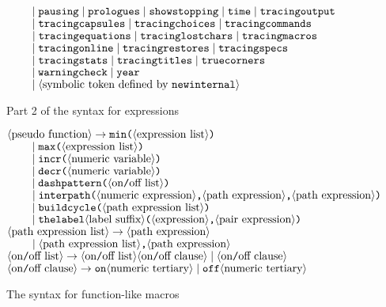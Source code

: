 \begin{figure}[htp]
\begin{ctabbing}
$\tt \qquad \;|\; pausing \;|\; prologues \;|\; showstopping \;|\; time \;|\; tracingoutput$\\
$\tt \qquad \;|\; tracingcapsules \;|\; tracingchoices \;|\; tracingcommands$\\
$\tt \qquad \;|\; tracingequations \;|\; tracinglostchars \;|\; tracingmacros$\\
$\tt \qquad \;|\; tracingonline \;|\; tracingrestores \;|\; tracingspecs$\\
$\tt \qquad \;|\; tracingstats \;|\; tracingtitles \;|\; truecorners$\\
$\tt \qquad \;|\; warningcheck \;|\; year$\\
$\tt \qquad \;|\; {\langle\hbox{symbolic token defined by {\tt newinternal}}\rangle}$
\end{ctabbing}
\caption{Part 2 of the syntax for expressions}
%
%
%
\label{syexpr2}
\end{figure}

\begin{figure}[htp]
\begin{ctabbing}
$\tt {\langle\hbox{pseudo function}\rangle} \rightarrow min\hbox{\tt (}{\langle\hbox{expression list}\rangle}\hbox{\tt )}$\\
$\tt \qquad \;|\; max\hbox{\tt (}{\langle\hbox{expression list}\rangle}\hbox{\tt )}$\\
$\tt \qquad \;|\; incr\hbox{\tt (}{\langle\hbox{numeric variable}\rangle}\hbox{\tt )}$\\
$\tt \qquad \;|\; decr\hbox{\tt (}{\langle\hbox{numeric variable}\rangle}\hbox{\tt )}$\\
$\tt \qquad \;|\; dashpattern\hbox{\tt (}{\langle\hbox{on\hbox{\tt /}off list}\rangle}\hbox{\tt )}$\\
$\tt \qquad \;|\; interpath\hbox{\tt (}{\langle\hbox{numeric expression}\rangle}\hbox{\tt ,} {\langle\hbox{path expression}\rangle}\hbox{\tt ,} {\langle\hbox{path expression}\rangle}\hbox{\tt )}$\\
$\tt \qquad \;|\; buildcycle\hbox{\tt (}{\langle\hbox{path expression list}\rangle}\hbox{\tt )}$\\
$\tt \qquad \;|\; thelabel{\langle\hbox{label suffix}\rangle}\hbox{\tt (}{\langle\hbox{expression}\rangle}\hbox{\tt ,} {\langle\hbox{pair expression}\rangle}\hbox{\tt )}$\\
$\tt {\langle\hbox{path expression list}\rangle} \rightarrow {\langle\hbox{path expression}\rangle}$\\
$\tt \qquad \;|\; {\langle\hbox{path expression list}\rangle}\hbox{\tt ,} {\langle\hbox{path expression}\rangle}$\\
$\tt {\langle\hbox{on\hbox{\tt /}off list}\rangle} \rightarrow {\langle\hbox{on\hbox{\tt /}off list}\rangle}{\langle\hbox{on\hbox{\tt /}off clause}\rangle} \;|\; {\langle\hbox{on\hbox{\tt /}off clause}\rangle}$\\
$\tt {\langle\hbox{on\hbox{\tt /}off clause}\rangle} \rightarrow on {\langle\hbox{numeric tertiary}\rangle} \;|\; off {\langle\hbox{numeric tertiary}\rangle}$
\end{ctabbing}
\caption{The syntax for function-like macros}
%
\label{sypseudo}
\end{figure}

